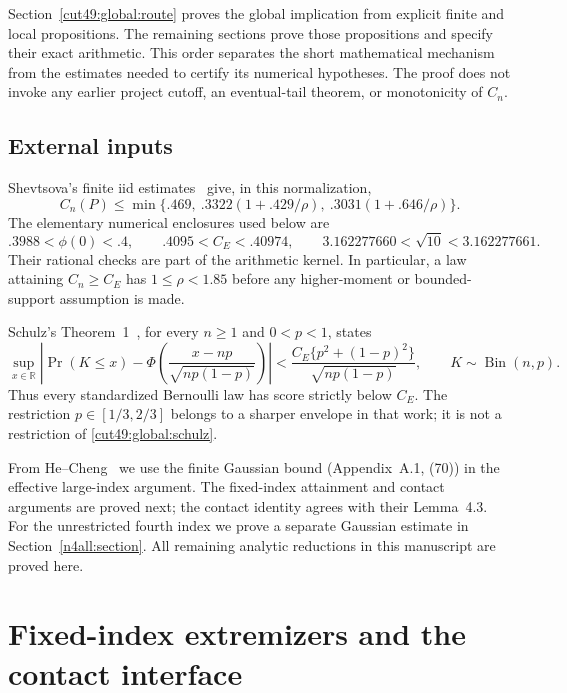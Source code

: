 \documentclass[11pt,a4paper]{article}
\numberwithin{equation}{section}
\theoremstyle{definition}
\theoremstyle{remark}
\begin{document}
Section~\ref{cut49:global:route} proves the global implication from explicit
finite and local propositions. The remaining sections prove those
propositions and specify their exact arithmetic. This order separates
the short mathematical mechanism from the estimates needed to certify
its numerical hypotheses. The proof does not invoke any earlier
project cutoff, an eventual-tail theorem, or monotonicity of $C_n$.

\subsection{External inputs}
Shevtsova's finite iid estimates~\cite{Shevtsova2013} give, in this normalization,
\begin{equation}\label{cut49:global:finitecaps}
 C_n(P)\le\min\{.469,\ .3322(1+.429/\rho),\ .3031(1+.646/\rho)\}.
\end{equation}
The elementary numerical enclosures used below are
\[
 .3988<\phi(0)<.4,\qquad .4095<C_E<.40974,
 \qquad 3.162277660<\sqrt{10}<3.162277661.
\]
Their rational checks are part of the arithmetic kernel. In particular,
a law attaining $C_n\ge C_E$ has $1\le\rho<1.85$ before any
higher-moment or bounded-support assumption is made.

Schulz's Theorem~1~\cite{Schulz2016}, for every $n\ge1$ and $0<p<1$,
states
\begin{equation}\label{cut49:global:schulz}
 \sup_{x\in\mathbb R}\left|\Pr(K\le x)
 -\Phi\left(\frac{x-np}{\sqrt{np(1-p)}}\right)\right|
 <\frac{C_E\{p^2+(1-p)^2\}}{\sqrt{np(1-p)}},
 \qquad K\sim\operatorname{Bin}(n,p).
\end{equation}
Thus every standardized Bernoulli law has score strictly below $C_E$.
The restriction $p\in[1/3,2/3]$ belongs to a sharper envelope in that
work; it is not a restriction of \eqref{cut49:global:schulz}.

From He--Cheng~\cite{HC} we use the finite Gaussian bound
(Appendix~A.1, (70)) in the effective large-index argument.
The fixed-index attainment and contact arguments are proved next;
the contact identity agrees with their Lemma~4.3.
For the unrestricted fourth index we prove a separate Gaussian estimate
in Section~\ref{n4all:section}. All remaining analytic reductions
in this manuscript are proved here.

\section{Fixed-index extremizers and the contact interface}
\end{document}
